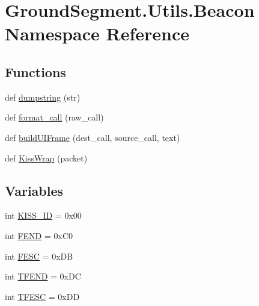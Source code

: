 \hypertarget{namespace_ground_segment_1_1_utils_1_1_beacon}{}\section{Ground\+Segment.\+Utils.\+Beacon Namespace Reference}
\label{namespace_ground_segment_1_1_utils_1_1_beacon}
\subsection*{Functions}
\begin{DoxyCompactItemize}
\item 
def \hyperlink{namespace_ground_segment_1_1_utils_1_1_beacon_adfb2779bde3d63761d9603a8edac9fd8}{dumpstring} (str)
\item 
def \hyperlink{namespace_ground_segment_1_1_utils_1_1_beacon_a320389a6bff963f4a547b15ca0f48a31}{format\+\_\+call} (raw\+\_\+call)
\item 
def \hyperlink{namespace_ground_segment_1_1_utils_1_1_beacon_a4606da40180bc3e3ae1b21cebebefb57}{build\+U\+I\+Frame} (dest\+\_\+call, source\+\_\+call, text)
\item 
def \hyperlink{namespace_ground_segment_1_1_utils_1_1_beacon_aec3880a396ac876da996d7a048ddc1d4}{Kiss\+Wrap} (packet)
\end{DoxyCompactItemize}
\subsection*{Variables}
\begin{DoxyCompactItemize}
\item 
int \hyperlink{namespace_ground_segment_1_1_utils_1_1_beacon_a5bbb6ca31f495f6a4753e7ce77a3a37c}{K\+I\+S\+S\+\_\+\+I\+D} = 0x00
\item 
int \hyperlink{namespace_ground_segment_1_1_utils_1_1_beacon_aef23f683493bc081ddcf7d5f6f4692c5}{F\+E\+N\+D} = 0x\+C0
\item 
int \hyperlink{namespace_ground_segment_1_1_utils_1_1_beacon_a89061100ccf07a8b5a02795602d6c061}{F\+E\+S\+C} = 0x\+D\+B
\item 
int \hyperlink{namespace_ground_segment_1_1_utils_1_1_beacon_a6ee81cd27f11b67a60f393db79b346e1}{T\+F\+E\+N\+D} = 0x\+D\+C
\item 
int \hyperlink{namespace_ground_segment_1_1_utils_1_1_beacon_a43e72faab7c53cb2b7af733f184637fd}{T\+F\+E\+S\+C} = 0x\+D\+D
\end{DoxyCompactItemize}


